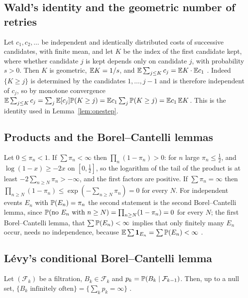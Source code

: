 \subsection{Wald's identity and the geometric number of retries}\label{app:wald}

Let $c_{1},c_{2},\dots$ be independent and identically distributed costs of successive candidates, with finite mean, and let $K$ be the index of the first candidate kept, where whether candidate $j$ is kept depends only on candidate $j$, with probability $s>0$. Then $K$ is geometric, $\mathbb{E} K=1/s$, and $\mathbb{E}\sum_{j\le K}c_{j}=\mathbb{E} K\cdot\mathbb{E} c_{1}$ \cite{Wal45}. Indeed $\{K\ge j\}$ is determined by the candidates $1,\dots,j-1$ and is therefore independent of $c_{j}$, so by monotone convergence $\mathbb{E}\sum_{j\le K}c_{j}=\sum_{j}\mathbb{E}[c_{j}]\mathbb{P}(K\ge j)=\mathbb{E} c_{1}\sum_{j}\mathbb{P}(K\ge j)=\mathbb{E} c_{1}\,\mathbb{E} K$. This is the identity used in Lemma~\ref{lem:onestep}.

\subsection{Products and the Borel--Cantelli lemmas}\label{app:bc}

Let $0\le\pi_{n}<1$. If $\sum\pi_{n}<\infty$ then $\prod_{n}(1-\pi_{n})>0$: for $n$ large $\pi_{n}\le\frac12$, and $\log(1-x)\ge-2x$ on $[0,\frac12]$, so the logarithm of the tail of the product is at least $-2\sum_{n\ge N}\pi_{n}>-\infty$, and the first factors are positive. If $\sum\pi_{n}=\infty$ then $\prod_{n\ge N}(1-\pi_{n})\le\exp(-\sum_{n\ge N}\pi_{n})=0$ for every $N$. For independent events $E_{n}$ with $\mathbb{P}(E_{n})=\pi_{n}$ the second statement is the second Borel--Cantelli lemma, since $\mathbb{P}(\text{no }E_{n}\text{ with }n\ge N)=\prod_{n\ge N}(1-\pi_{n})=0$ for every $N$; the first Borel--Cantelli lemma, that $\sum\mathbb{P}(E_{n})<\infty$ implies that only finitely many $E_{n}$ occur, needs no independence, because $\mathbb{E}\sum\mathbf{1}_{E_{n}}=\sum\mathbb{P}(E_{n})<\infty$ \cite{Bor09,Dur19}.

\subsection{L\'evy's conditional Borel--Cantelli lemma}\label{app:levy}

Let $(\mathcal F_{k})$ be a filtration, $B_{k}\in\mathcal F_{k}$ and $p_{k}=\mathbb{P}(B_{k}\mid\mathcal F_{k-1})$. Then, up to a null set, $\{B_{k}\text{ infinitely often}\}=\{\sum_{k}p_{k}=\infty\}$ \cite[Section~4.3]{Dur19}.

